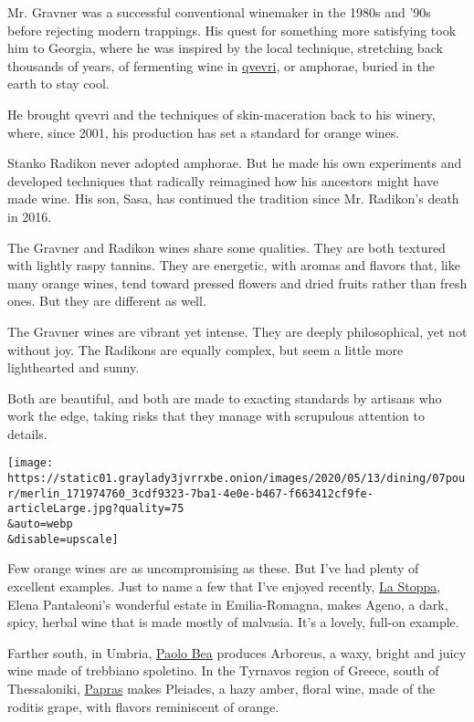 Mr. Gravner was a successful conventional winemaker in the 1980s and
'90s before rejecting modern trappings. His quest for something more
satisfying took him to Georgia, where he was inspired by the local
technique, stretching back thousands of years, of fermenting wine in
\href{https://www.tastinggeorgia.com/wine}{qvevri}, or amphorae, buried
in the earth to stay cool.

He brought qvevri and the techniques of skin-maceration back to his
winery, where, since 2001, his production has set a standard for orange
wines.

Stanko Radikon never adopted amphorae. But he made his own experiments
and developed techniques that radically reimagined how his ancestors
might have made wine. His son, Sasa, has continued the tradition since
Mr. Radikon's death in 2016.

The Gravner and Radikon wines share some qualities. They are both
textured with lightly raspy tannins. They are energetic, with aromas and
flavors that, like many orange wines, tend toward pressed flowers and
dried fruits rather than fresh ones. But they are different as well.

The Gravner wines are vibrant yet intense. They are deeply
philosophical, yet not without joy. The Radikons are equally complex,
but seem a little more lighthearted and sunny.

Both are beautiful, and both are made to exacting standards by artisans
who work the edge, taking risks that they manage with scrupulous
attention to details.

\texttt{[image: https://static01.graylady3jvrrxbe.onion/images/2020/05/13/dining/07pour/merlin\_171974760\_3cdf9323-7ba1-4e0e-b467-f663412cf9fe-articleLarge.jpg?quality=75\\\&auto=webp\\\&disable=upscale]}

Few orange wines are as uncompromising as these. But I've had plenty of
excellent examples. Just to name a few that I've enjoyed recently,
\href{https://www.lastoppa.it/homepage-eng}{La Stoppa}, Elena
Pantaleoni's wonderful estate in Emilia-Romagna, makes Ageno, a dark,
spicy, herbal wine that is made mostly of malvasia. It's a lovely,
full-on example.

Farther south, in Umbria,
\href{http://www.paolobea.com/en/1/1/home.html}{Paolo Bea} produces
Arboreus, a waxy, bright and juicy wine made of trebbiano spoletino. In
the Tyrnavos region of Greece, south of Thessaloniki,
\href{http://www.eklektikon.com/portfolio/papras/}{Papras} makes
Pleiades, a hazy amber, floral wine, made of the roditis grape, with
flavors reminiscent of orange.

